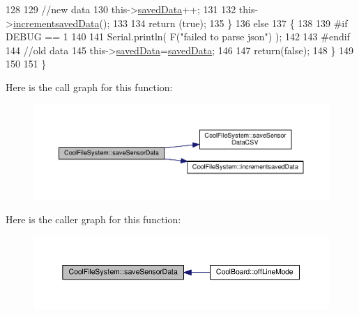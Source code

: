 \begin{DoxyCode}
128 
129         \textcolor{comment}{//new data}
130         this->\hyperlink{class_cool_file_system_ad9f5b739a32100f5f21270c3d9ee2b1d}{savedData}++;
131 
132         this->\hyperlink{class_cool_file_system_aae045125288f255f3e258073dcada2a6}{incrementsavedData}();
133         
134         \textcolor{keywordflow}{return} (\textcolor{keyword}{true});      
135     \}
136     \textcolor{keywordflow}{else}
137     \{
138     
139 \textcolor{preprocessor}{    #if DEBUG == 1}
140 
141         Serial.println( F(\textcolor{stringliteral}{"failed to parse json"}) );
142     
143 \textcolor{preprocessor}{    #endif}
144         \textcolor{comment}{//old data}
145         this->\hyperlink{class_cool_file_system_ad9f5b739a32100f5f21270c3d9ee2b1d}{savedData}=\hyperlink{class_cool_file_system_ad9f5b739a32100f5f21270c3d9ee2b1d}{savedData};
146 
147         \textcolor{keywordflow}{return}(\textcolor{keyword}{false});
148     \}
149     
150 
151 \}
\end{DoxyCode}
Here is the call graph for this function\+:\nopagebreak
\begin{figure}[H]
\begin{center}
\leavevmode
\includegraphics[width=350pt]{db/d0c/class_cool_file_system_afa3a4feae94871d4d3b6bebb701c2e67_cgraph}
\end{center}
\end{figure}
Here is the caller graph for this function\+:\nopagebreak
\begin{figure}[H]
\begin{center}
\leavevmode
\includegraphics[width=350pt]{db/d0c/class_cool_file_system_afa3a4feae94871d4d3b6bebb701c2e67_icgraph}
\end{center}
\end{figure}
\mbox{\label{class_cool_file_system_ab78704d5d21ce10fc6f1138ab5ab46c8}} 
